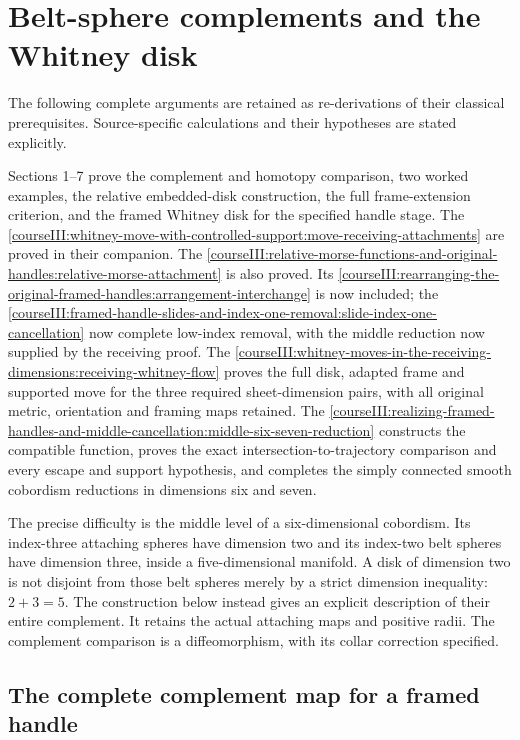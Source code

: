 \section{Belt-sphere complements and the Whitney disk}\label{courseIII:belt-sphere-complements-and-the-whitney-disk:section}

The following complete arguments are retained as re-derivations of their classical prerequisites. Source-specific calculations and their hypotheses are stated explicitly.

Sections 1--7 prove the complement and homotopy comparison, two worked examples, the relative embedded-disk construction, the full frame-extension criterion, and the framed Whitney disk for the specified handle stage. The \cref{courseIII:whitney-move-with-controlled-support:move-receiving-attachments} are proved in their companion. The \cref{courseIII:relative-morse-functions-and-original-handles:relative-morse-attachment} is also proved. Its \cref{courseIII:rearranging-the-original-framed-handles:arrangement-interchange} is now included; the \cref{courseIII:framed-handle-slides-and-index-one-removal:slide-index-one-cancellation} now complete low-index removal, with the middle reduction now supplied by the receiving proof. The \cref{courseIII:whitney-moves-in-the-receiving-dimensions:receiving-whitney-flow} proves the full disk, adapted frame and supported move for the three required sheet-dimension pairs, with all original metric, orientation and framing maps retained. The \cref{courseIII:realizing-framed-handles-and-middle-cancellation:middle-six-seven-reduction} constructs the compatible function, proves the exact intersection-to-trajectory comparison and every escape and support hypothesis, and completes the simply connected smooth cobordism reductions in dimensions six and seven.

The precise difficulty is the middle level of a six-dimensional cobordism. Its index-three attaching spheres have dimension two and its index-two belt spheres have dimension three, inside a five-dimensional manifold. A disk of dimension two is not disjoint from those belt spheres merely by a strict dimension inequality: \(2+3=5\). The construction below instead gives an explicit description of their entire complement. It retains the actual attaching maps and positive radii. The complement comparison is a diffeomorphism, with its collar correction specified.

\subsection{The complete complement map for a framed handle}
\label{courseIII:belt-sphere-complements-and-the-whitney-disk:belt-complement-map}

